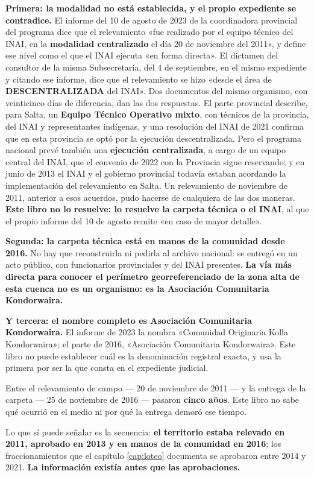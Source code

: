 \textbf{Primera: la modalidad no está establecida, y el propio expediente se contradice.} El informe del 10 de agosto de 2023 de la coordinadora provincial del programa dice que el relevamiento «fue realizado por el equipo técnico del INAI, en la \textbf{modalidad centralizado} el día 20 de noviembre del 2011», y define ese nivel como el que el INAI ejecuta «en forma directa». El dictamen del consultor de la misma Subsecretaría, del 4 de septiembre, en el mismo expediente y citando ese informe, dice que el relevamiento se hizo «desde el área de \textbf{DESCENTRALIZADA} del INAI». Dos documentos del mismo organismo, con veinticinco días de diferencia, dan las dos respuestas. El parte provincial describe, para Salta, un \textbf{Equipo Técnico Operativo mixto}, con técnicos de la provincia, del INAI y representantes indígenas, y una resolución del INAI de 2021 confirma que en esta provincia se optó por la ejecución descentralizada. Pero el programa nacional prevé también una \textbf{ejecución centralizada}, a cargo de un equipo central del INAI, que el convenio de 2022 con la Provincia sigue reservando; y en junio de 2013 el INAI y el gobierno provincial todavía estaban acordando la implementación del relevamiento en Salta. Un relevamiento de noviembre de 2011, anterior a esos acuerdos, pudo hacerse de cualquiera de las dos maneras. \textbf{Este libro no lo resuelve: lo resuelve la carpeta técnica o el INAI}, al que el propio informe del 10 de agosto remite «en caso de mayor detalle».

\textbf{Segunda: la carpeta técnica está en manos de la comunidad desde 2016.} No hay que
reconstruirla ni pedirla al archivo nacional: se entregó en un acto público, con funcionarios
provinciales y del INAI presentes. \textbf{La vía más directa para conocer el perímetro
georreferenciado de la zona alta de esta cuenca no es un organismo: es la Asociación
Comunitaria Kondorwaira.}

\textbf{Y tercera: el nombre completo es Asociación Comunitaria Kondorwaira.} El informe de
2023 la nombra «Comunidad Originaria Kolla Kondorwaira»; el parte de 2016, «Asociación
Comunitaria Kondorwaira». Este libro no puede establecer cuál es la denominación registral
exacta, y usa la primera por ser la que consta en el expediente judicial.

\begin{cautela}
Entre el relevamiento de campo --- 20 de noviembre de 2011 --- y la entrega de la carpeta ---
25 de noviembre de 2016 --- pasaron \textbf{cinco años}. Este libro no sabe qué ocurrió en el
medio ni por qué la entrega demoró ese tiempo.

Lo que sí puede señalar es la secuencia: \textbf{el territorio estaba relevado en 2011,
aprobado en 2013 y en manos de la comunidad en 2016}; los fraccionamientos que el capítulo \ref{cap:loteo} documenta se aprobaron entre 2014 y 2021. \textbf{La información existía antes que las
aprobaciones.}
\end{cautela}

